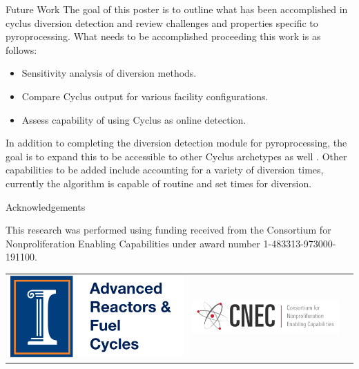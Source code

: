 \documentclass[final]{beamer}
\newlength{\onecolwid}
\newlength{\threecolwid}
\begin{document}
\begin{frame}[t]
\begin{columns}[t,totalwidth=\threecolwid]
\begin{column}{\onecolwid}
\begin{alertblock}{Future Work}
	The goal of this poster is to outline what has been accomplished in cyclus diversion detection and review challenges and properties
	specific to pyroprocessing. What needs to be accomplished proceeding this work is as follows:
	\begin{itemize}
		\item Sensitivity analysis of diversion methods.
		\item Compare Cyclus output for various facility configurations.
		\item Assess capability of using Cyclus as online detection.
	\end{itemize} 
	\vspace{10mm}
	In addition to completing the diversion detection module for pyroprocessing, the goal is to expand this to be accessible to
	other Cyclus archetypes as well \cite{Huff_2016}. Other capabilities to be added include accounting for a variety of diversion times,
	currently the algorithm is capable of routine and set times for diversion.
\end{alertblock}



\begin{block}{Acknowledgements}
	
	This research was performed using funding received
	from the Consortium for Nonproliferation Enabling
	Capabilities under award number 1-483313-973000-191100.
	
	\vspace{10mm}
	\begin{center}
		\begin{tabular}{ccc}
			\includegraphics[width=0.3\linewidth]{logo.png} & \includegraphics[width=0.5\linewidth]{cnec_logo.png}
		\end{tabular}
	\end{center}
	

\end{block}
\end{column}
\end{columns}
\end{frame}
\end{document}

